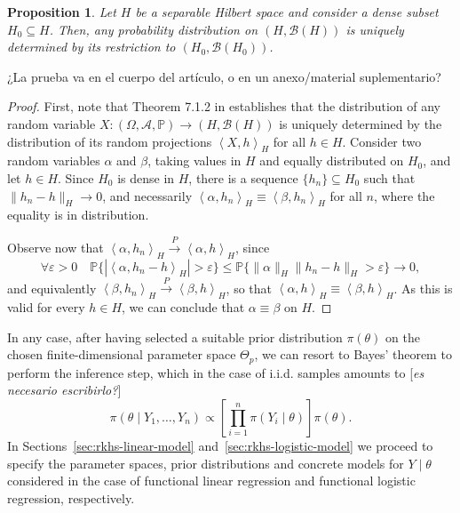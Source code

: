 \documentclass[ba]{imsart}
\numberwithin{equation}{section}
\theoremstyle{plain}
\newtheorem{prop}{Proposition}[section]
\renewcommand{\epsilon}{\varepsilon}
\newcommand\dotprod[2]{\left\langle #1, #2 \right\rangle}
\newenvironment{comment}
{
\noindent \em \color{red}
}
{
\color{black}
}
\newcommand\incomment[1]{\color{red}[\textit{#1}]\color{black}}
\begin{document}
\begin{prop} Let \(H\) be a separable Hilbert space and consider a dense subset \(H_0\subseteq H\). Then, any probability distribution on \((H, \mathcal{B}(H))\) is uniquely determined by its restriction to \((H_0, \mathcal B(H_0))\).
\end{prop}
\begin{comment}
    ¿La prueba va en el cuerpo del artículo, o en un anexo/material suplementario?
\end{comment}

\begin{proof}

First, note that Theorem 7.1.2 in \citet[p.~177]{hsing2015theoretical} establishes that the distribution of any random variable \(X: (\Omega, \mathcal A, \mathbb{P})\to (H, \mathcal B(H))\) is uniquely determined by the distribution of its random projections \(\dotprod{X}{h}_H\) for all \(h \in H\).
Consider two random variables \(\alpha\) and \(\beta\), taking values in \(H\) and equally distributed on \(H_0\), and let \(h \in H\). Since \(H_0\) is dense in \(H\), there is a sequence \(\{h_n\}\subseteq H_0\) such that \(\|h_n - h\|_H \to 0\), and necessarily \(\dotprod{\alpha}{h_n}_H \equiv \dotprod{\beta}{h_n}_H\) for all \(n\), where the equality is in distribution.

Observe now that \(\dotprod{\alpha}{h_n}_H \overset{P}{\to} \dotprod{\alpha}{h}_H\), since
\[
\forall \epsilon > 0 \quad \mathbb{P}\{|\dotprod{\alpha}{h_n - h}_H| > \epsilon\} \leq \mathbb{P}\{\|\alpha\|_H \|h_n - h\|_H > \epsilon\} \to 0,
\]
and equivalently \(\dotprod{\beta}{h_n}_H \overset{P}{\to} \dotprod{\beta}{h}_H\), so that \(\dotprod{\alpha}{h}_H \equiv \dotprod{\beta}{h}_H\). As this is valid for every \(h \in H\), we can conclude that \(\alpha \equiv \beta\) on \(H\).
\end{proof}

In any case, after having selected a suitable prior distribution \(\pi(\theta)\) on the chosen finite-dimensional parameter space \(\Theta_p\), we can resort to Bayes' theorem to perform the inference step, which in the case of i.i.d. samples amounts to \incomment{es necesario escribirlo?}
\begin{equation}\label{eq:bayes-theorem}
  \pi(\theta \mid Y_1, \dots, Y_n) \propto \left[ \prod_{i=1}^n \pi(Y_i\mid \theta) \right]\pi(\theta).
\end{equation}
In Sections~\ref{sec:rkhs-linear-model} and~\ref{sec:rkhs-logistic-model} we proceed to specify the parameter spaces, prior distributions and concrete models for \(Y\mid \theta\) considered in the case of functional linear regression and functional logistic regression, respectively.
\end{document}

